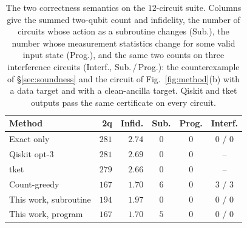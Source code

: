 \begin{table}[t]
\centering\small
\caption{The two correctness semantics on the $12$-circuit suite. Columns give the
summed two-qubit count and infidelity, the number of circuits whose
action as a subroutine changes (Sub.), the number whose measurement
statistics change for some valid input state (Prog.), and the same two
counts on three interference circuits (Interf., Sub.\,/\,Prog.): the
counterexample of \S\ref{sec:soundness} and the circuit of
Fig.~\ref{fig:method}(b) with a data target and with a clean-ancilla target.
Qiskit and tket outputs pass the same certificate on every circuit.}
\label{tab:semantics}
\setlength{\tabcolsep}{3.5pt}
\begin{tabular}{lrrccc}
\toprule
Method & 2q & Infid. & Sub. & Prog. & Interf. \\
\midrule
Exact only & $281$ & $2.74$ & $0$ & $0$ & 0 / 0 \\
Qiskit opt-3 & $281$ & $2.69$ & $0$ & $0$ & -- \\
tket & $279$ & $2.66$ & $0$ & $0$ & -- \\
Count-greedy & $167$ & $1.70$ & $6$ & $0$ & 3 / 3 \\
This work, subroutine & $194$ & $1.97$ & $0$ & $0$ & 0 / 0 \\
This work, program & $167$ & $1.70$ & $5$ & $0$ & 0 / 0 \\
\bottomrule
\end{tabular}
\end{table}
